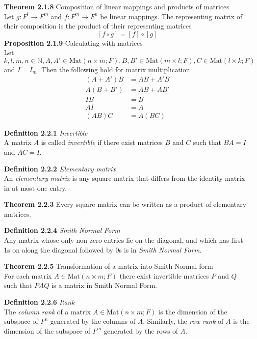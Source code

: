\documentclass[8pt,landscape]{article}
\begin{document}
\begin{multicols}{3}
    \textbf{Theorem 2.1.8} Composition of linear mappings and products of matrices \\
    Let $g : F^l \to F^m$ and $f : F^m \to F^n$ be linear mappings.
    The representing matrix of their composition is the product of their representing
    matrices
    \[
        [f \circ g] = [f] \circ [g]
    \]
    \textbf{Proposition 2.1.9} Calculating with matrices \\
    Let $k, l, m, n \in \mathbb{N}, A, A' \in \mathrm{Mat}(n \times m;F),
    B, B' \in \mathrm{Mat}(m \times l;F), C \in \mathrm{Mat}(l \times k; F)$ and
    $I = I_m$.
    Then the following hold for matrix multiplication
    \begin{align*}{}
        (A + A')B & = AB + A'B \\
        A(B + B') & = AB + AB' \\
        IB        & = B \\
        AI        & = A \\
        (AB)C     & = A(BC)
    \end{align*}


    \textbf{Definition 2.2.1} \emph{Invertible} \\
    A matrix $A$ is called \emph{invertible} if there exist matrices $B$ and $C$
    such that
    $BA = I$ and $AC = I$.

    \textbf{Definition 2.2.2} \emph{Elementary matrix} \\
    An \emph{elementary matrix} is any square matrix that differs from the identity
    matrix in at most one entry.

    \textbf{Theorem 2.2.3}
    Every square matrix can be written as a product of elementary matrices.

    \textbf{Definition 2.2.4} \emph{Smith Normal Form} \\
    Any matrix whose only non-zero entries lie on the diagonal,
    and which has first 1s on along the diagonal followed by 0s is in
    \emph{Smith Normal Form}.

    \textbf{Theorem 2.2.5} Transformation of a matrix into Smith-Normal form \\
    For each matrix $A \in \mathrm{Mat}(n \times m; F)$ there exist invertible matrices
    $P$ and $Q$ such that $PAQ$ is a matrix in Smith Normal Form.

    \textbf{Definition 2.2.6} \emph{Rank} \\
    The \emph{column rank} of a matrix $A \in \mathrm{Mat}(n \times m; F)$
    is the dimension of the subspace of $F^n$ generated by the columns of $A$.
    Similarly, the \emph{row rank} of $A$ is the dimension of the subspace of $F^m$
    generated by the rows of $A$.


\end{multicols}
\end{document}
